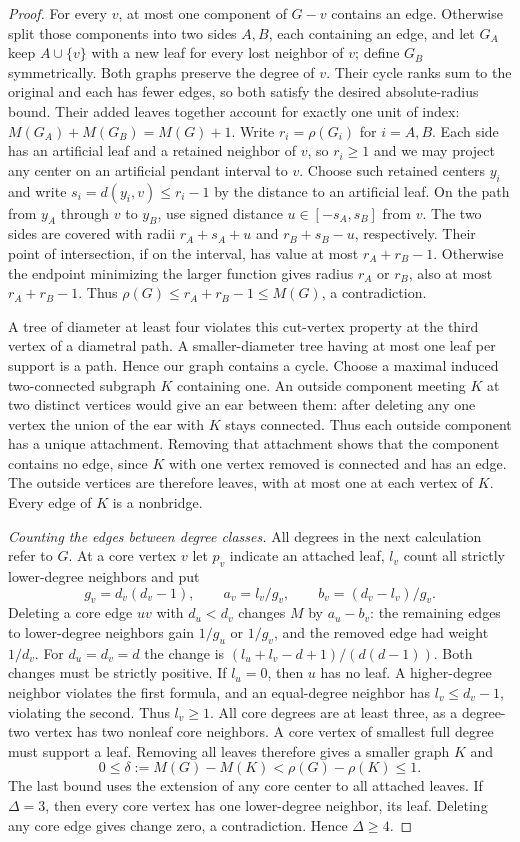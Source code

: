 \documentclass[11pt,a4paper]{article}
\begin{document}
\begin{proof}
For every $v$, at most one component of $G-v$ contains an edge.
Otherwise split those components into two sides $A,B$, each containing
an edge, and let $G_A$ keep $A\cup\{v\}$ with a new leaf for every
lost neighbor of $v$; define $G_B$ symmetrically. Both graphs preserve
the degree of $v$. Their cycle ranks sum to the original and each
has fewer edges, so both satisfy the desired absolute-radius bound.
Their added leaves together account for exactly one unit of index:
$M(G_A)+M(G_B)=M(G)+1$. Write $r_i=\rho(G_i)$ for $i=A,B$.
Each side has an artificial leaf and a retained neighbor of $v$, so
$r_i\ge1$ and we may project any center on an artificial pendant
interval to $v$. Choose such retained centers $y_i$ and write
$s_i=d(y_i,v)\le r_i-1$ by the distance to an artificial leaf.
On the path from $y_A$ through $v$ to $y_B$, use signed distance
$u\in[-s_A,s_B]$ from $v$. The two sides are covered with radii
$r_A+s_A+u$ and $r_B+s_B-u$, respectively. Their point of intersection,
if on the interval, has value at most $r_A+r_B-1$.
Otherwise the endpoint minimizing the larger function gives radius
$r_A$ or $r_B$, also at most $r_A+r_B-1$. Thus
$\rho(G)\le r_A+r_B-1\le M(G)$, a contradiction.

A tree of diameter at least four violates this cut-vertex property at
the third vertex of a diametral path. A smaller-diameter tree having
at most one leaf per support is a path. Hence our graph contains a
cycle. Choose a maximal induced two-connected subgraph $K$ containing
one. An outside component meeting $K$ at two distinct vertices would
give an ear between them: after deleting any one vertex the union of
the ear with $K$ stays connected. Thus each outside component has a
unique attachment. Removing that attachment shows that the component
contains no edge, since $K$ with one vertex removed is connected and
has an edge. The outside vertices are therefore leaves, with at most
one at each vertex of $K$. Every edge of $K$ is a nonbridge.

\emph{Counting the edges between degree classes.} All degrees in the
next calculation refer to $G$. At a core vertex $v$ let $p_v$ indicate an
attached leaf, $l_v$ count all strictly lower-degree neighbors and put
\[
 g_v=d_v(d_v-1),\qquad
 a_v=l_v/g_v,\qquad b_v=(d_v-l_v)/g_v .
\]
Deleting a core edge $uv$ with $d_u<d_v$ changes $M$ by $a_u-b_v$:
the remaining edges to lower-degree neighbors gain $1/g_u$ or $1/g_v$,
and the removed edge had weight $1/d_v$. For $d_u=d_v=d$ the change is
$(l_u+l_v-d+1)/(d(d-1))$. Both changes must be strictly positive.
If $l_u=0$, then $u$ has no leaf. A higher-degree neighbor violates the
first formula, and an equal-degree neighbor has $l_v\le d_v-1$,
violating the second. Thus $l_v\ge1$. All core degrees are at least
three, as a degree-two vertex has two nonleaf core neighbors. A core
vertex of smallest full degree must support a leaf. Removing all leaves
therefore gives a smaller graph $K$ and
\[
 0\le\delta:=M(G)-M(K)<\rho(G)-\rho(K)\le1 .
\]
The last bound uses the extension of any core center to all attached
leaves. If $\Delta=3$, then every core vertex has one lower-degree
neighbor, its leaf. Deleting any core edge gives change zero, a
contradiction. Hence $\Delta\ge4$.


\end{proof}
\end{document}
